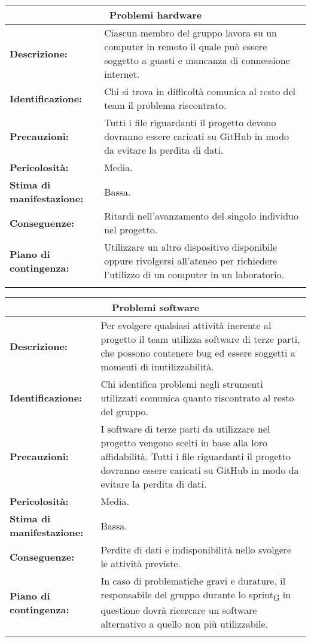 \vspace{20pt}

\begin{tabularx}{\textwidth}{|X|X|}
\hline
\multicolumn{2}{|c|}{\textbf{Problemi hardware}} \\
\hline
\textbf{Descrizione:}& Ciascun membro del gruppo lavora su un computer in remoto il quale può essere soggetto a guasti e mancanza di connessione internet.\\
\hline
\textbf{Identificazione:}& Chi si trova in difficoltà comunica al resto del team il problema riscontrato.\\
\hline
\textbf{Precauzioni:}& Tutti i file riguardanti il progetto devono dovranno essere caricati su GitHub in modo da evitare la perdita di dati.\\
\hline
\textbf{Pericolosità:}& Media.\\
\hline
\textbf{Stima di manifestazione:}& Bassa.\\
\hline
\textbf{Conseguenze:}& Ritardi nell'avanzamento del singolo individuo nel progetto.\\
\hline
\textbf{Piano di contingenza:}& Utilizzare un altro dispositivo disponibile oppure rivolgersi all'ateneo per richiedere l'utilizzo di un computer in un laboratorio.\\
\hline
\caption{Problemi hardware}
\end{tabularx}

\begin{tabularx}{\textwidth}{|X|X|}
\hline
\multicolumn{2}{|c|}{\textbf{Problemi software}} \\
\hline
\textbf{Descrizione:}& Per svolgere qualsiasi attività inerente al progetto il team utilizza software di terze parti, che possono contenere bug ed essere soggetti a momenti di inutilizzabilità.\\
\hline
\textbf{Identificazione:}& Chi identifica problemi negli strumenti utilizzati comunica quanto riscontrato al resto del gruppo.\\
\hline
\textbf{Precauzioni:}& I software di terze parti da utilizzare nel progetto vengono scelti in base alla loro affidabilità. Tutti i file riguardanti il progetto dovranno essere caricati su GitHub in modo da evitare la perdita di dati.\\
\hline
\textbf{Pericolosità:}& Media.\\
\hline
\textbf{Stima di manifestazione:}& Bassa.\\
\hline
\textbf{Conseguenze:}& Perdite di dati e indisponibilità nello svolgere le attività previste.\\
\hline
\textbf{Piano di contingenza:}& In caso di problematiche gravi e durature, il responsabile del gruppo durante lo sprint\textsubscript{G} in questione dovrà ricercare un software alternativo a quello non più utilizzabile.\\
\hline
\caption{Problemi software}
\end{tabularx}

